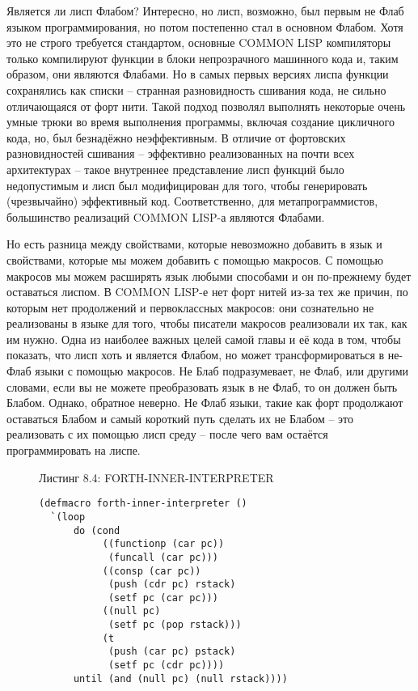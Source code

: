 Является ли лисп Флабом? Интересно, но лисп, возможно, был первым не Флаб языком программирования, но потом постепенно стал в основном Флабом. Хотя это не строго требуется стандартом, основные COMMON LISP компиляторы только компилируют функции в блоки непрозрачного машинного кода и, таким образом, они являются Флабами. Но в самых первых версиях лиспа функции сохранялись как списки -- странная разновидность сшивания кода, не сильно отличающаяся от форт нити. Такой подход позволял выполнять некоторые очень умные трюки во время выполнения программы, включая создание цикличного кода, но, был безнадёжно неэффективным. В отличие от фортовских разновидностей сшивания -- эффективно реализованных на почти всех архитектурах -- такое внутреннее представление лисп функций было недопустимым и лисп был модифицирован для того, чтобы генерировать (чрезвычайно) эффективный код. Соответственно, для метапрограммистов, большинство реализаций COMMON LISP-а являются Флабами.

Но есть разница между свойствами, которые невозможно добавить в язык и свойствами, которые мы можем добавить с помощью макросов. С помощью макросов мы можем расширять язык любыми способами и он по-прежнему будет оставаться лиспом. В COMMON LISP-е нет форт нитей из-за тех же причин, по которым нет продолжений и первоклассных макросов: они сознательно не реализованы в языке для того, чтобы писатели макросов реализовали их так, как им нужно. Одна из наиболее важных целей самой главы и её кода в том, чтобы показать, что лисп хоть и является Флабом, но может трансформироваться в не-Флаб языки с помощью макросов. Не Блаб подразумевает, не Флаб, или другими словами, если вы не можете преобразовать язык в не Флаб, то он должен быть Блабом. Однако, обратное неверно. Не Флаб языки, такие как форт продолжают оставаться Блабом и самый короткий путь сделать их не Блабом -- это реализовать с их помощью лисп среду -- после чего вам остаётся программировать на лиспе.

\begin{figure}Листинг 8.4: FORTH-INNER-INTERPRETER\label{listing_8.4}
  \listbegin
\begin{verbatim}
(defmacro forth-inner-interpreter ()
  `(loop
      do (cond
           ((functionp (car pc))
            (funcall (car pc)))
           ((consp (car pc))
            (push (cdr pc) rstack)
            (setf pc (car pc)))
           ((null pc)
            (setf pc (pop rstack)))
           (t
            (push (car pc) pstack)
            (setf pc (cdr pc))))
      until (and (null pc) (null rstack))))
\end{verbatim}
  \listend
\end{figure}

